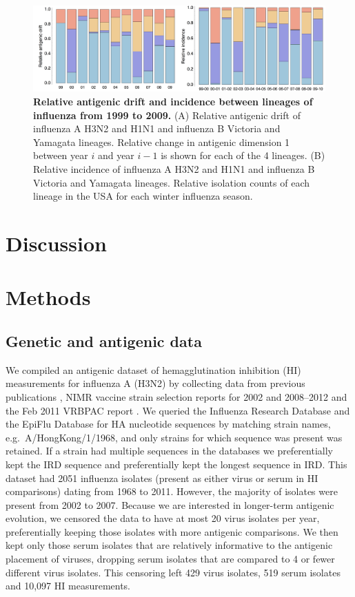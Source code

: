 \documentclass[11pt,oneside,letterpaper]{article}
\begin{document}
\begin{figure}[tb]
	\centering		
	\includegraphics[width=\textwidth]{figures/drift_incidence}
	\caption{\textbf{Relative antigenic drift and incidence between lineages of influenza from 1999 to 2009.} 
	(A) Relative antigenic drift of influenza A H3N2 and H1N1 and influenza B Victoria and Yamagata lineages.
	Relative change in antigenic dimension 1 between year $i$ and year $i-1$ is shown for each of the 4 lineages.
	(B) Relative incidence of influenza A H3N2 and H1N1 and influenza B Victoria and Yamagata lineages.
	Relative isolation counts of each lineage in the USA for each winter influenza season.
	} 
	\label{drift_incidence} 
\end{figure}

\section*{Discussion}

\section*{Methods}

\subsection*{Genetic and antigenic data}

We compiled an antigenic dataset of hemagglutination inhibition (HI) measurements for influenza A (H3N2) by collecting data from previous publications \cite{Hay01,Smith04,Russell08,Barr10}, NIMR vaccine strain selection reports for 2002 and 2008--2012 \cite{NIMR02,NIMRMarch08,NIMRFeb09,NIMRFeb10,NIMRSep10,NIMRSep11,NIMRFeb12} and the Feb 2011 VRBPAC report \cite{Cox11FDA}.
We queried the Influenza Research Database \cite{IRD} and the EpiFlu Database \cite{GISAID} for HA nucleotide sequences by matching strain names, e.g.\ A/HongKong/1/1968, and only strains for which sequence was present was retained.
If a strain had multiple sequences in the databases we preferentially kept the IRD sequence and preferentially kept the longest sequence in IRD. 
This dataset had 2051 influenza isolates (present as either virus or serum in HI comparisons) dating from 1968 to 2011. 
However, the majority of isolates were present from 2002 to 2007. 
Because we are interested in longer-term antigenic evolution, we censored the data to have at most 20 virus isolates per year, preferentially keeping those isolates with more antigenic comparisons. 
We then kept only those serum isolates that are relatively informative to the antigenic placement of viruses, dropping serum isolates that are compared to 4 or fewer different virus isolates.
This censoring left 429 virus isolates, 519 serum isolates and 10,097 HI measurements. 
\end{document}
